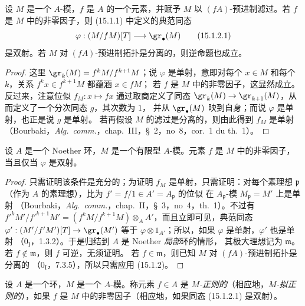 \begin{lemma}[15.1.2]
\label{0.15.1.2-fr}
设 $M$ 是一个 $A$-模，$f$ 是 $A$ 的一个元素，并赋予 $M$ 以
$(fA)$-预进制滤过。若 $f$ 是 $M$ 中的非零因子，则 (15.1.1) 中定义的典范同态
\[
  \varphi:(M/fM)[T]\longrightarrow\gr_\bullet(M)
  \tag{15.1.2.1}\label{0.15.1.2.1-fr}
\]
是双射。若 $M$ 对 $(fA)$-预进制拓扑是分离的，则逆命题也成立。
\end{lemma}

\begin{proof}
这里 $\gr_k(M)=f^kM/f^{k+1}M$；说 $\varphi$ 是单射，意即对每个
$x\in M$ 和每个 $k$，关系 $f^kx\in f^{k+1}M$ 都蕴涵 $x\in fM$；
若 $f$ 是 $M$ 中的非零因子，这显然成立。反过来，注意位似
$f_M:x\mapsto fx$ 通过取商定义了同态
$\gr_k(M)\to\gr_{k+1}(M)$，从而定义了一个分次同态 $g$，其次数为 $1$，
并从 $\gr_\bullet(M)$ 映到自身；而说 $\varphi$ 是单射，也正是说 $g$ 是单射。
若再假设 $M$ 的滤过是分离的，则由此得到 $f_M$ 是单射
（Bourbaki，\emph{Alg.~comm.}，chap.~III，\S~2，no~8，cor.~1 du th.~1）。
\end{proof}

\begin{corollary}[15.1.3]
\label{0.15.1.3-fr}
设 $A$ 是一个 Noether 环，$M$ 是一个有限型 $A$-模。元素 $f$ 是
$M$ 中的非零因子，当且仅当 $\varphi$ 是双射。
\end{corollary}

\begin{proof}
只需证明该条件是充分的；为证明 $f_M$ 是单射，只需证明：对每个素理想
$\mathfrak p$（作为 $A$ 的素理想），比为 $f'=f/1\in A'=A_{\mathfrak p}$ 的位似
在 $A_{\mathfrak p}$-模 $M_{\mathfrak p}=M'$ 上是单射
（Bourbaki，\emph{Alg.~comm.}，chap.~II，\S~3，no~4，th.~1）。不过有
$f'^kM'/f'^{k+1}M'=(f^kM/f^{k+1}M)\otimes_A A'$，而且立即可见，典范同态
$\varphi':(M'/f'M')[T]\to\gr_\bullet(M')$ 等于
$\varphi\otimes 1_{A'}$；所以，如果 $\varphi$ 是单射，$\varphi'$ 也是单射
（$0_{\mathrm I}$，1.3.2）。于是归结到 $A$ 是 Noether \emph{局部}环的情形，
其极大理想记为 $\mathfrak m$。若 $f\notin\mathfrak m$，则 $f$ 可逆，无须证明。
若 $f\in\mathfrak m$，则已知 $M$ 对 $(fA)$-预进制拓扑是分离的
（$0_{\mathrm I}$，7.3.5），所以只需应用 (15.1.2)。
\end{proof}

\begin{definition}[15.1.4]
\label{0.15.1.4-fr}
设 $A$ 是一个环，$M$ 是一个 $A$-模。称元素 $f\in A$ 是
\emph{$M$-正则的}（相应地，\emph{$M$-拟正则的}），如果 $f$ 是
$M$ 中的非零因子（相应地，如果同态 (15.1.2.1) 是双射）。
\end{definition}

